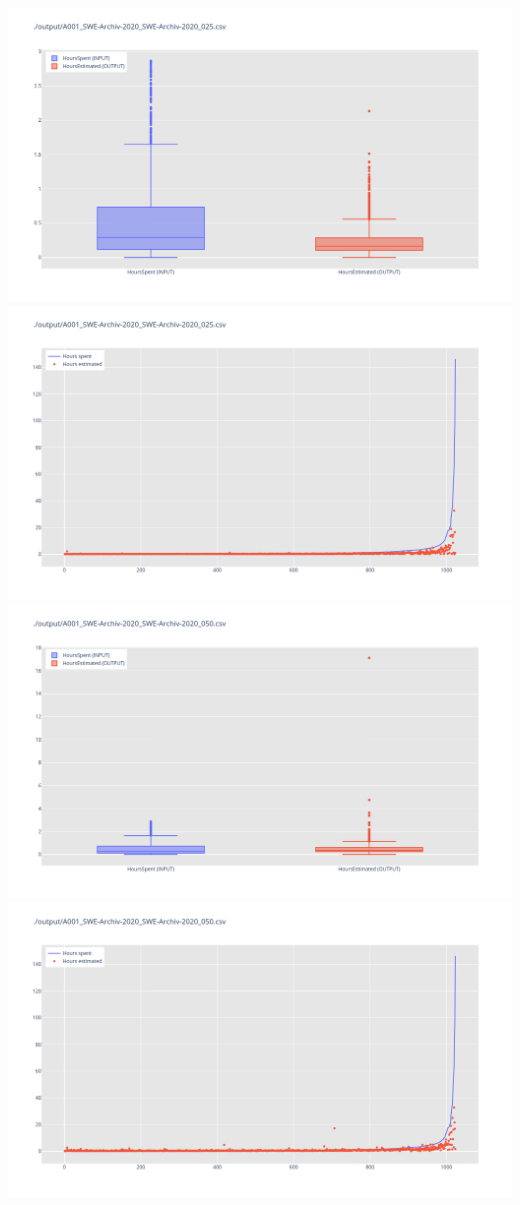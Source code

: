\includegraphics[width=\textwidth]{Scripts/output/A001_SWE-Archiv-2020_SWE-Archiv-2020_025.csv.png}
\includegraphics[width=\textwidth]{Scripts/output/A001_SWE-Archiv-2020_SWE-Archiv-2020_025.csv.scatter.png}
\includegraphics[width=\textwidth]{Scripts/output/A001_SWE-Archiv-2020_SWE-Archiv-2020_050.csv.png}
\includegraphics[width=\textwidth]{Scripts/output/A001_SWE-Archiv-2020_SWE-Archiv-2020_050.csv.scatter.png}
